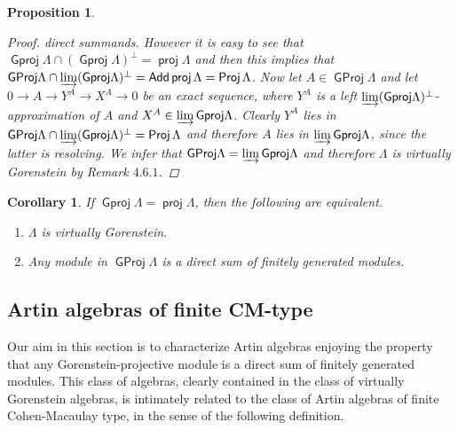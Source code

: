 \documentclass[oneside, a4paper,reqno]{amsart}
\numberwithin{equation}{section}
\newtheorem{cor}[thm]{Corollary}
\newtheorem{prop}[thm]{Proposition}
\theoremstyle{definition}
\begin{document}
\begin{prop}
\begin{proof}
direct summands. However it is easy to see that ${\operatorname{\mathsf{Gproj}}\nolimits}\Lambda \cap
({\operatorname{\mathsf{Gproj}}\nolimits}\Lambda)^{\bot} = \operatorname*{\mathsf{proj}}\Lambda$ and then this implies that
${\operatorname{\mathsf{GProj}}\nolimits}\Lambda \cap \operatorname*{\varinjlim}({\operatorname{\mathsf{Gproj}}\nolimits}\Lambda)^{\bot} = \operatorname*{\mathsf{Add}}\operatorname*{\mathsf{proj}}\Lambda
= \operatorname*{\mathsf{Proj}}\Lambda$. Now let $A \in {\operatorname{\mathsf{GProj}}\nolimits}\Lambda$ and let $0 {\longrightarrow} A
{\longrightarrow} Y^{A} {\longrightarrow} X^{A} {\longrightarrow} 0$ be an exact sequence, where $Y^{A}$ is
a left $\operatorname*{\varinjlim}({\operatorname{\mathsf{Gproj}}\nolimits}\Lambda)^{\bot}$-approximation of $A$ and
$X^{A} \in \operatorname*{\varinjlim}{\operatorname{\mathsf{Gproj}}\nolimits}\Lambda$. Clearly $Y^{A}$ lies in
${\operatorname{\mathsf{GProj}}\nolimits}\Lambda \cap \operatorname*{\varinjlim}({\operatorname{\mathsf{Gproj}}\nolimits}\Lambda)^{\bot} = \operatorname*{\mathsf{Proj}}\Lambda$ and
therefore $A$ lies in $\operatorname*{\varinjlim}{\operatorname{\mathsf{Gproj}}\nolimits}\Lambda$, since the latter is
resolving. We infer that ${\operatorname{\mathsf{GProj}}\nolimits}\Lambda = \operatorname*{\varinjlim}{\operatorname{\mathsf{Gproj}}\nolimits}\Lambda$ and
therefore $\Lambda$ is virtually Gorenstein by Remark $4.6.1$.
\end{proof}
\end{prop}

\begin{cor} If ${\operatorname{\mathsf{Gproj}}\nolimits}\Lambda = \operatorname*{\mathsf{proj}}\Lambda$, then the following
are equivalent.
\begin{enumerate}
\item $\Lambda$ is virtually Gorenstein.
\item Any module in ${\operatorname{\mathsf{GProj}}\nolimits}\Lambda$ is a direct sum of finitely
generated modules.
\end{enumerate}
\end{cor}

\subsection{Artin algebras of finite CM-type} Our aim in this section is to
characterize Artin algebras enjoying the property that any
Gorenstein-projective module is a direct sum of finitely generated
modules.  This class of algebras, clearly contained in the class of
virtually Gorenstein algebras, is intimately related to the class of
Artin algebras of finite Cohen-Macaulay type, in the sense of the
following definition.
\end{document}
